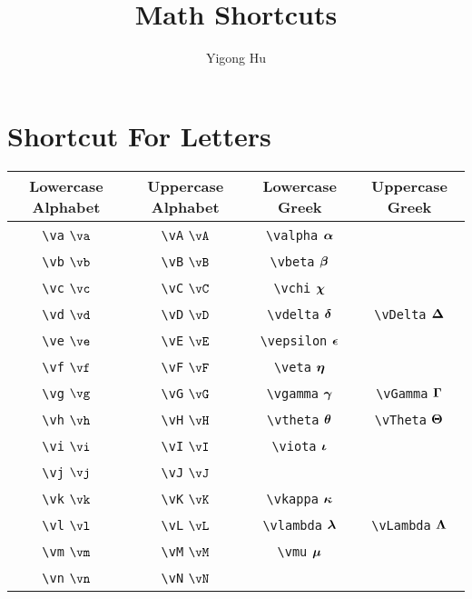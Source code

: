 \documentclass{article}
\title{Math Shortcuts}
\author{Yigong Hu}
\date{ }
\begin{document}
\maketitle

\section{Shortcut For Letters}

\begin{table}[h]
    \centering
    \begin{tabular}{cccc}\toprule
    \textbf{Lowercase Alphabet} & \textbf{Uppercase Alphabet} & \textbf{Lowercase Greek} & \textbf{Uppercase Greek}   \\\midrule
    \verb"\va" \quad $\va$ & \verb"\vA" \quad $\vA$ & \verb"\valpha" \quad $\bm\alpha$ & \\
    \verb"\vb" \quad $\vb$ & \verb"\vB" \quad $\vB$ & \verb"\vbeta" \quad $\bm\beta$ & \\
    \verb"\vc" \quad $\vc$ & \verb"\vC" \quad $\vC$ & \verb"\vchi" \quad $\bm\chi$ & \\
    \verb"\vd" \quad $\vd$ & \verb"\vD" \quad $\vD$ & \verb"\vdelta" \quad $\bm\delta$ & \verb"\vDelta" \quad $\bm\Delta$ \\
    \verb"\ve" \quad $\ve$ & \verb"\vE" \quad $\vE$ & \verb"\vepsilon" \quad $\bm\epsilon$ & \\
    \verb"\vf" \quad $\vf$ & \verb"\vF" \quad $\vF$ & \verb"\veta" \quad $\bm\eta$ & \\
    \verb"\vg" \quad $\vg$ & \verb"\vG" \quad $\vG$ & \verb"\vgamma" \quad $\bm\gamma$ & \verb"\vGamma" \quad $\bm\Gamma$ \\
    \verb"\vh" \quad $\vh$ & \verb"\vH" \quad $\vH$ & \verb"\vtheta" \quad $\bm\theta$ & \verb"\vTheta" \quad $\bm\Theta$ \\
    \verb"\vi" \quad $\vi$ & \verb"\vI" \quad $\vI$ & \verb"\viota" \quad $\bm\iota$ & \\
    \verb"\vj" \quad $\vj$ & \verb"\vJ" \quad $\vJ$ & & \\
    \verb"\vk" \quad $\vk$ & \verb"\vK" \quad $\vK$ & \verb"\vkappa" \quad $\bm\kappa$ & \\
    \verb"\vl" \quad $\vl$ & \verb"\vL" \quad $\vL$ & \verb"\vlambda" \quad $\bm\lambda$ & \verb"\vLambda" \quad $\bm\Lambda$ \\
    \verb"\vm" \quad $\vm$ & \verb"\vM" \quad $\vM$ & \verb"\vmu" \quad $\bm\mu$ & \\
    \verb"\vn" \quad $\vn$ & \verb"\vN" \quad $\vN$ & & \\

\end{tabular}
\end{table}
\end{document}
